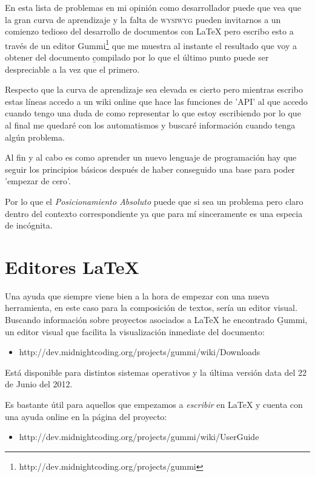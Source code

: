 \documentclass[11pt]{article}
\begin{document}
En esta lista de problemas en mi opini\'on como desarrollador puede que vea que la gran curva de aprendizaje y la falta de \textsc{wysiwyg} pueden invitarnos a un comienzo tedioso del desarrollo de documentos con \LaTeX{} pero escribo esto a trav\'es de un editor Gummi\footnote{http://dev.midnightcoding.org/projects/gummi} que me muestra al instante el resultado que voy a obtener del documento \b{compilado} por lo que el \'ultimo punto puede ser despreciable a la vez que el primero.

Respecto que la curva de aprendizaje sea elevada es cierto pero mientras escribo estas l\'ineas accedo a un wiki online que hace las funciones de 'API' al que accedo cuando tengo una duda de como representar lo que estoy escribiendo por lo que al final me quedar\'e con los automatismos y buscar\'e informaci\'on cuando tenga alg\'un problema.

Al fin y al cabo es como aprender un nuevo lenguaje de programaci\'on hay que seguir los principios b\'asicos despu\'es de haber conseguido una base para poder 'empezar de cero'.

Por lo que el \emph{Posicionamiento Absoluto} puede que si sea un problema pero claro dentro del contexto correspondiente ya que para m\'i sinceramente es una especia de inc\'ognita.

\section{Editores \LaTeX{}}

Una ayuda que siempre viene bien a la hora de empezar con una nueva herramienta, en este caso para la composición de textos, sería un editor visual.
Buscando información sobre proyectos asociados a LaTeX he encontrado \b{Gummi}, un editor visual que facilita la visualización inmediate del documento:

\begin{itemize}
	\item http://dev.midnightcoding.org/projects/gummi/wiki/Downloads
\end{itemize}

Est\'a disponible para distintos sistemas operativos y la \'ultima versión data del 22 de Junio del 2012. 

Es bastante \'util para aquellos que empezamos a \emph{escribir} en \LaTeX{} y cuenta con una ayuda online en la página del proyecto:

\begin{itemize}
	\item http://dev.midnightcoding.org/projects/gummi/wiki/UserGuide
\end{itemize}
\end{document}

